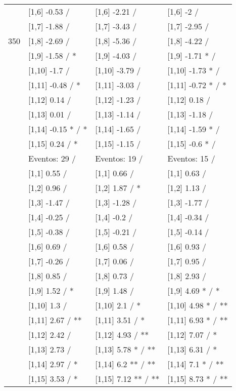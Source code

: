 \begin{table}
\begin{tabular}[t]{llll}
 & {}[1,6] -0.53  / & {}[1,6] -2.21  / & {}[1,6] -2  /\\
 & {}[1,7] -1.88  / & {}[1,7] -3.43  / & {}[1,7] -2.95  /\\
350 & {}[1,8] -2.69  / & {}[1,8] -5.36  / & {}[1,8] -4.22  /\\
\addlinespace
 & {}[1,9] -1.58  / * & {}[1,9] -4.03  / & {}[1,9] -1.71 * /\\
 & {}[1,10] -1.7  / & {}[1,10] -3.79  / & {}[1,10] -1.73 * /\\
 & {}[1,11] -0.48  / * & {}[1,11] -3.03  / & {}[1,11] -0.72 * / *\\
 & {}[1,12] 0.14  / & {}[1,12] -1.23  / & {}[1,12] 0.18  /\\
 & {}[1,13] 0.01  / & {}[1,13] -1.14  / & {}[1,13] -1.18  /\\
\addlinespace
 & {}[1,14] -0.15 * / * & {}[1,14] -1.65  / & {}[1,14] -1.59 * /\\
 & {}[1,15] 0.24  / * & {}[1,15] -1.15  / & {}[1,15] -0.6 * /\\
 & Eventos:  29 / & Eventos:  19 / & Eventos:  15 /\\
 & {}[1,1] 0.55  / & {}[1,1] 0.66  / & {}[1,1] 0.63  /\\
 & {}[1,2] 0.96  / & {}[1,2] 1.87  / * & {}[1,2] 1.13  /\\
\addlinespace
 & {}[1,3] -1.47  / & {}[1,3] -1.28  / & {}[1,3] -1.77  /\\
 & {}[1,4] -0.25  / & {}[1,4] -0.2  / & {}[1,4] -0.34  /\\
 & {}[1,5] -0.38  / & {}[1,5] -0.21  / & {}[1,5] -0.14  /\\
 & {}[1,6] 0.69  / & {}[1,6] 0.58  / & {}[1,6] 0.93  /\\
 & {}[1,7] -0.26  / & {}[1,7] 0.06  / & {}[1,7] 0.95  /\\
\addlinespace
500 & {}[1,8] 0.85  / & {}[1,8] 0.73  / & {}[1,8] 2.93  /\\
 & {}[1,9] 1.52  / * & {}[1,9] 1.48  / & {}[1,9] 4.69 * / *\\
 & {}[1,10] 1.3  / & {}[1,10] 2.1  / * & {}[1,10] 4.98 * / **\\
 & {}[1,11] 2.67  / ** & {}[1,11] 3.51  / * & {}[1,11] 6.93 * / **\\
 & {}[1,12] 2.42  / & {}[1,12] 4.93  / ** & {}[1,12] 7.07  / *\\
\addlinespace
 & {}[1,13] 2.73  / & {}[1,13] 5.78 * / ** & {}[1,13] 6.31  / *\\
 & {}[1,14] 2.97  / * & {}[1,14] 6.2 ** / ** & {}[1,14] 7.1 * / **\\
 & {}[1,15] 3.53  / * & {}[1,15] 7.12 ** / ** & {}[1,15] 8.73 * / **\\
\bottomrule
\end{tabular}
\end{table}
